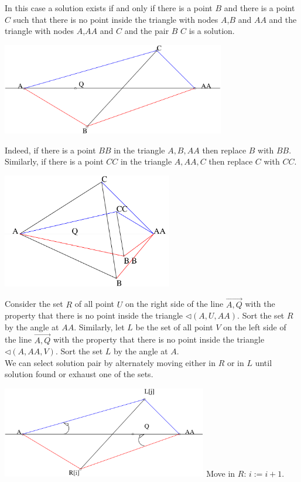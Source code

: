 In this case a solution exists if and only if there is a point $B$ and there is a point $C$ such that there is no point inside the triangle with nodes $A$,$B$ and $AA$ and the triangle with nodes $A$,$AA$ and $C$ and the pair $B$ $C$ is a solution.\\
\begin{center}
\includegraphics[height=4cm]{img/abra42.pdf}
\end{center}
Indeed, if there is a  point $BB$ in the triangle $A,B,AA$ then replace $B$ with $BB$. Similarly, if there is a point $CC$ in the triangle $A,AA,C$ then replace $C$ with $CC$.\\
\begin{center}
\centering
\includegraphics[height=5cm]{img/newtree22.pdf}
\end{center}
Consider the set $R$ of all point $U$ on the right side of the line $\overrightarrow{A,Q}$ with the property that there is no point inside the triangle $\lhd(A,U,AA)$. Sort the set $R$ by the angle at $AA$. Similarly, let $L$ be the set of all point $V$ on the left side of the line $\overrightarrow{A,Q}$ with the property that there is no point inside the triangle $\lhd(A,AA,V)$. Sort the set $L$ by the angle at $A$. \\
We can select solution pair by alternately moving either in $R$ or in $L$ until solution found or exhaust one of the sets.\\
\begin{center}
\includegraphics[height=4cm]{img/abra43.pdf}
Move in $R$: $i:=i+1$.\\
\end{center}
